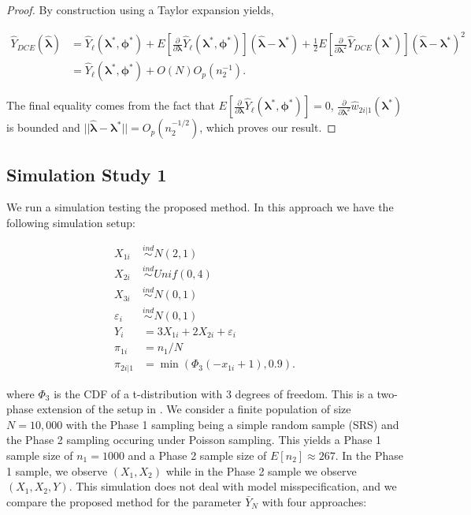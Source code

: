 \documentclass[12pt]{article}
\begin{document}
\begin{proof}
  By construction using a Taylor expansion yields,

  \begin{align*}
    \hat Y_{DCE}(\hat{\bm \lambda}) 
    &= \hat Y_\ell(\bm \lambda^*, \bm \phi^*) + 
    E\left[\frac{\partial}{\partial \bm \lambda}\hat Y_\ell(\bm \lambda^*,
    \bm \phi^*)\right](\hat{\bm \lambda} - \bm \lambda^*) + \frac{1}{2}
    E\left[\frac{\partial}{\partial \bm \lambda^2} \hat Y_{DCE}(\bm \lambda^*)\right] 
    (\hat{\bm \lambda} - \bm \lambda^*)^2\\
    &= \hat Y_\ell(\bm \lambda^*, \bm \phi^*) + O(N)O_p(n_2^{-1}).
  \end{align*}

  The final equality comes from the fact that 
  $E\left[\frac{\partial}{\partial \bm \lambda}\hat Y_\ell(\bm \lambda^*, \bm \phi^*)\right]
  = 0$, $\frac{\partial}{\partial \bm \lambda^2} \hat w_{2i|1}(\bm \lambda^*)$ is
  bounded and $||\hat{\bm \lambda} - \bm \lambda^*|| = O_p(n_2^{-1/2})$, which proves our
  result.
\end{proof}

\subsection{Simulation Study 1}

We run a simulation testing the proposed method. In this approach we have the
following simulation setup:

$$
\begin{aligned}
X_{1i} &\stackrel{ind}{\sim} N(2, 1) \\
X_{2i} &\stackrel{ind}{\sim} Unif(0, 4) \\
X_{3i} &\stackrel{ind}{\sim} N(0, 1) \\
\varepsilon_i &\stackrel{ind}{\sim} N(0, 1) \\
Y_{i} &= 3 X_{1i} + 2 X_{2i} + \varepsilon_i \\
\pi_{1i} &= n_1 / N \\
\pi_{2i|1} &= \min(\Phi_3(-x_{1i} + 1), 0.9).
\end{aligned}
$$

where $\Phi_3$ is the CDF of a t-distribution with 3 degrees of freedom.
This is a two-phase extension of the setup in \cite{kwon2024debiased}. We
consider a finite population of size $N = 10,000$ with the Phase 1 sampling
being a simple random sample (SRS) and the 
Phase 2 sampling occuring under Poisson sampling. This yields a
Phase 1 sample
size of $n_1 = 1000$ and a Phase 2 sample size of
$E[n_2] \approx 267$. In the Phase 1 sample, we observe 
$(X_1, X_2)$ while in the Phase 2 sample we observe $(X_1, X_2, Y)$. This
simulation does not deal with model misspecification, and we compare the
proposed method for the parameter $\bar Y_N$ with four approaches:
\end{document}
